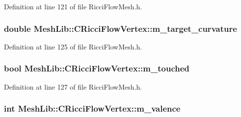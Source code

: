 Definition at line 121 of file Ricci\+Flow\+Mesh.\+h.

\subsubsection[{\texorpdfstring{m\+\_\+target\+\_\+curvature}{m_target_curvature}}]{\setlength{\rightskip}{0pt plus 5cm}double Mesh\+Lib\+::\+C\+Ricci\+Flow\+Vertex\+::m\+\_\+target\+\_\+curvature\hspace{0.3cm}{\ttfamily [protected]}}\hypertarget{class_mesh_lib_1_1_c_ricci_flow_vertex_abdfb30ac08fc9aff4c7052bfb4986de3}{}\label{class_mesh_lib_1_1_c_ricci_flow_vertex_abdfb30ac08fc9aff4c7052bfb4986de3}


Definition at line 125 of file Ricci\+Flow\+Mesh.\+h.

\subsubsection[{\texorpdfstring{m\+\_\+touched}{m_touched}}]{\setlength{\rightskip}{0pt plus 5cm}bool Mesh\+Lib\+::\+C\+Ricci\+Flow\+Vertex\+::m\+\_\+touched\hspace{0.3cm}{\ttfamily [protected]}}\hypertarget{class_mesh_lib_1_1_c_ricci_flow_vertex_ac66ef1157c3442bb632cdf89d509370e}{}\label{class_mesh_lib_1_1_c_ricci_flow_vertex_ac66ef1157c3442bb632cdf89d509370e}


Definition at line 127 of file Ricci\+Flow\+Mesh.\+h.

\subsubsection[{\texorpdfstring{m\+\_\+valence}{m_valence}}]{\setlength{\rightskip}{0pt plus 5cm}int Mesh\+Lib\+::\+C\+Ricci\+Flow\+Vertex\+::m\+\_\+valence\hspace{0.3cm}{\ttfamily [protected]}}\hypertarget{class_mesh_lib_1_1_c_ricci_flow_vertex_a5a1d0671376b738ad92c860eeb24eb09}{}\label{class_mesh_lib_1_1_c_ricci_flow_vertex_a5a1d0671376b738ad92c860eeb24eb09}



